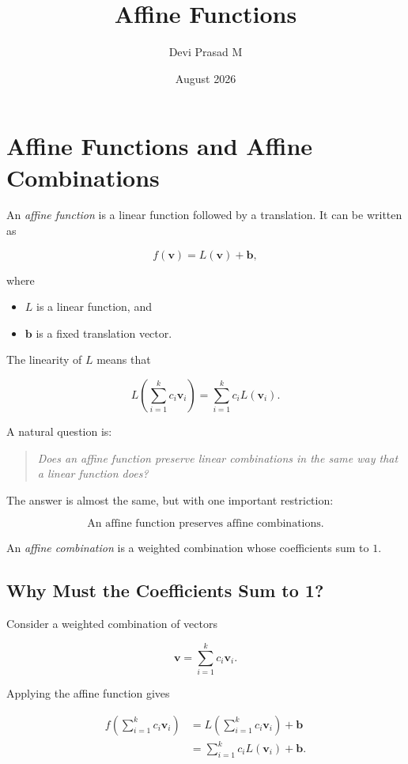 \documentclass[12pt]{article}
\title{\textbf{Affine Functions}}
\author{Devi Prasad M}
\date{August 2026}
\newcommand{\Vector}[1]{\mathbf{#1}}
\begin{document}
\maketitle

\section{Affine Functions and Affine Combinations}
An \emph{affine function} is a linear function followed by a
translation. It can be written as

\[
    f(\Vector{v}) = L(\Vector{v}) + \Vector{b},
\]

where

\begin{itemize}
    \item $L$ is a linear function, and
    \item $\Vector{b}$ is a fixed translation vector.
\end{itemize}

The linearity of $L$ means that

\[
L\left(
    \sum_{i=1}^{k} c_i\Vector{v}_i
\right)
=
\sum_{i=1}^{k} c_iL(\Vector{v}_i).
\]

A natural question is:

\begin{quote}
\emph{Does an affine function preserve linear combinations in the
same way that a linear function does?}
\end{quote}

The answer is almost the same, but with one important restriction:

\[
\boxed{
\text{An affine function preserves affine combinations.}
}
\]

An \emph{affine combination} is a weighted combination whose
coefficients sum to $1$.

\subsection{Why Must the Coefficients Sum to 1?}

Consider a weighted combination of vectors

\[
    \Vector{v}
    =
    \sum_{i=1}^{k} c_i\Vector{v}_i.
\]

Applying the affine function gives

\begin{align*}
f\left(
    \sum_{i=1}^{k} c_i\Vector{v}_i
\right)
&=
L\left(
    \sum_{i=1}^{k} c_i\Vector{v}_i
\right)
+
\Vector{b}
\\[4pt]
&=
\sum_{i=1}^{k} c_iL(\Vector{v}_i)
+
\Vector{b}.
\end{align*}
\end{document}
